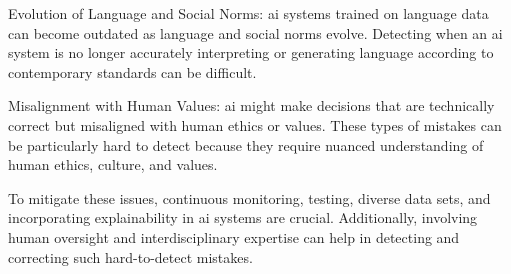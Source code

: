 \begin{aibox}
Evolution of Language and Social Norms: \gls{ai} systems trained on language data can become outdated as language and social norms evolve. Detecting when an \gls{ai} system is no longer accurately interpreting or generating language according to contemporary standards can be difficult.

Misalignment with Human Values: \gls{ai} might make decisions that are technically correct but misaligned with human ethics or values. These types of mistakes can be particularly hard to detect because they require nuanced understanding of human ethics, culture, and values.

To mitigate these issues, continuous monitoring, testing, diverse data sets, and incorporating explainability in \gls{ai} systems are crucial. Additionally, involving human oversight and interdisciplinary expertise can help in detecting and correcting such hard-to-detect mistakes.
\end{aibox}
